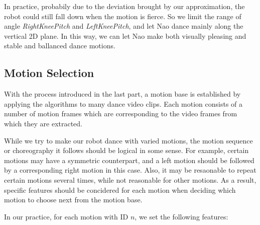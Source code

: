 \documentclass[UTF8,a4paper]{article}
\begin{document}
	In practice, probabily due to the deviation brought by our approximation, the robot could still fall down when the motion is fierce. So we limit the range of angle {\itshape RightKneePitch} and {\itshape LeftKneePitch}, and let Nao dance mainly along the vertical 2D plane. In this way, we can let Nao make both visually pleasing and stable and ballanced dance motions.

	\subsection{Motion Selection}\label{motion_selection}

	\noindent With the process introduced in the last part, a motion base is established by applying the algorithms to many dance video clips. Each motion consists of a number of motion frames which are corresponding to the video frames from which they are extracted.
	
	While we try to make our robot dance with varied motions, the motion sequence or choreography it follows should be logical in some sense. For example, certain motions may have a symmetric counterpart, and a left motion should be followed by a corresponding right motion in this case. Also, it may be resaonable to repeat certain motions several times, while not reasonable for other motions. As a result, specific features should be concidered for each motion when deciding which motion to choose next from the motion base.

	In our practice, for each motion with ID $n$, we set the following features:
\end{document}
